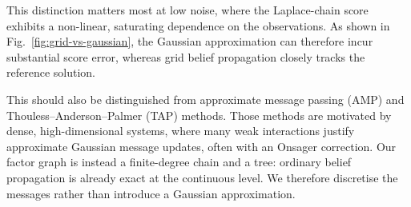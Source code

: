 This distinction matters most at low noise, where the
Laplace-chain score exhibits a non-linear, saturating
dependence on the observations. As shown in
Fig.~\ref{fig:grid-vs-gaussian}, the Gaussian approximation
can therefore incur substantial score error, whereas grid
belief propagation closely tracks the reference solution.

This should also be distinguished from approximate message
passing (AMP) and Thouless--Anderson--Palmer (TAP) methods.
Those methods are motivated by dense, high-dimensional
systems, where many weak interactions justify approximate
Gaussian message updates, often with an Onsager correction.
Our factor graph is instead a finite-degree chain and a tree:
ordinary belief propagation is already exact at the
continuous level. We therefore discretise the messages
rather than introduce a Gaussian approximation.